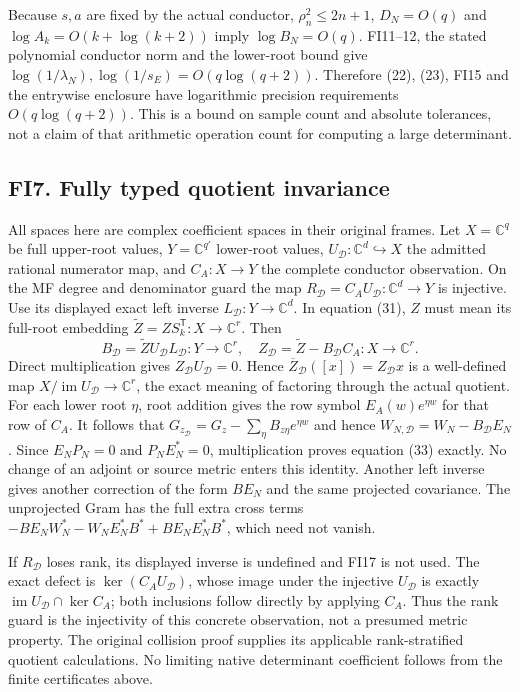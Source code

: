 \documentclass[11pt]{article}
\begin{document}
Because \(s,a\) are fixed by the actual conductor, \(\rho_n^2\le2n+1\), \(D_N=O(q)\) and \(\log A_k=O(k+\log(k+2))\) imply \(\log B_N=O(q)\). FI11--12, the stated polynomial conductor norm and the lower-root bound give \(\log(1/\lambda_N),\log(1/s_E)=O(q\log(q+2))\). Therefore (22), (23), FI15 and the entrywise enclosure have logarithmic precision requirements \(O(q\log(q+2))\). This is a bound on sample count and absolute tolerances, not a claim of that arithmetic operation count for computing a large determinant.

\subsection{FI7. Fully typed quotient invariance}\label{fi7.-fully-typed-quotient-invariance}

All spaces here are complex coefficient spaces in their original frames. Let \(X=\mathbb C^q\) be full upper-root values, \(Y=\mathbb C^{q'}\) lower-root values, \(U_{\mathcal D}:\mathbb C^d\hookrightarrow X\) the admitted rational numerator map, and \(C_A:X\to Y\) the complete conductor observation. On the MF degree and denominator guard the map \(R_{\mathcal D}=C_AU_{\mathcal D}:\mathbb C^d\to Y\) is injective. Use its displayed exact left inverse \(L_{\mathcal D}:Y\to\mathbb C^d\). In equation (31), \(Z\) must mean its full-root embedding \(\widetilde Z=ZS_k^{\mathsf T}:X\to\mathbb C^r\). Then \[
 B_{\mathcal D}=\widetilde ZU_{\mathcal D}L_{\mathcal D}:Y\to\mathbb C^r,
 \quad Z_{\mathcal D}=\widetilde Z-B_{\mathcal D}C_A:X\to\mathbb C^r.
 \tag{FI17}
\] Direct multiplication gives \(Z_{\mathcal D}U_{\mathcal D}=0\). Hence \(\overline Z_{\mathcal D}([x])=Z_{\mathcal D}x\) is a well-defined map \(X/\operatorname{im}U_{\mathcal D}\to\mathbb C^r\), the exact meaning of factoring through the actual quotient. For each lower root \(\eta\), root addition gives the row symbol \(E_A(w)e^{\eta w}\) for that row of \(C_A\). It follows that \(G_{z_{\mathcal D}}=G_z-\sum_\eta B_{z\eta}e^{\eta w}\) and hence \(W_{N,\mathcal D}=W_N-B_{\mathcal D}E_N\). Since \(E_NP_N=0\) and \(P_NE_N^*=0\), multiplication proves equation (33) exactly. No change of an adjoint or source metric enters this identity. Another left inverse gives another correction of the form \(BE_N\) and the same projected covariance. The unprojected Gram has the full extra cross terms \(-BE_NW_N^*-W_NE_N^*B^*+BE_NE_N^*B^*\), which need not vanish.

If \(R_{\mathcal D}\) loses rank, its displayed inverse is undefined and FI17 is not used. The exact defect is \(\ker(C_AU_{\mathcal D})\), whose image under the injective \(U_{\mathcal D}\) is exactly \(\operatorname{im}U_{\mathcal D}\cap\ker C_A\); both inclusions follow directly by applying \(C_A\). Thus the rank guard is the injectivity of this concrete observation, not a presumed metric property. The original collision proof supplies its applicable rank-stratified quotient calculations. No limiting native determinant coefficient follows from the finite certificates above.
\end{document}
